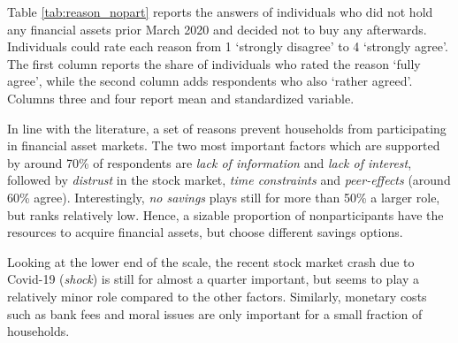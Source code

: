 \documentclass[ProjectABM]{subfiles}
\begin{document}
Table \ref{tab:reason_nopart} reports the answers of individuals who did not hold any financial assets prior March 2020 and decided not to buy any afterwards. Individuals could rate each reason from 1 `strongly disagree' to 4 `strongly agree'. The first column reports the share of individuals who rated the reason `fully agree', while the second column adds respondents who also `rather agreed'. Columns three and four report mean and standardized variable. %

In line with the literature, a set of reasons prevent households from participating in financial asset markets. The two most important factors which are supported by around 70\% of respondents are \textit{lack of information} and \textit{lack of interest}, followed by \textit{distrust} in the stock market, \textit{time constraints} and \textit{peer-effects} (around 60\% agree). Interestingly, \textit{no savings} plays still for more than 50\% a larger role, but ranks relatively low. Hence, a sizable proportion of nonparticipants have the resources to acquire financial assets, but choose different savings options. %


Looking at the lower end of the scale, the recent stock market crash due to Covid-19 (\textit{shock}) is still for almost a quarter important, but seems to play a relatively minor role compared to the other factors. Similarly, monetary costs such as bank fees and moral issues are only important for a small fraction of households.
\end{document}
